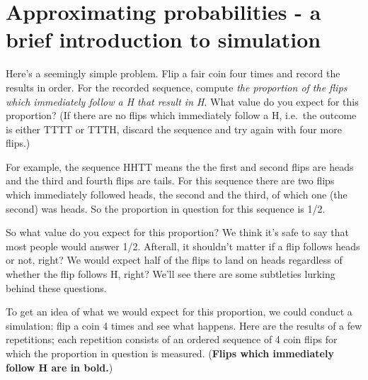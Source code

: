 \documentclass[
]{book}
\theoremstyle{definition}
\theoremstyle{definition}
\theoremstyle{definition}
\theoremstyle{remark}
\begin{document}
\hypertarget{sim}{%
\section{Approximating probabilities - a brief introduction to simulation}\label{sim}}

Here's a seemingly simple problem. Flip a fair coin four times and record the results in order. For the recorded sequence, compute \emph{the proportion of the flips which immediately follow a H that result in H}. What value do you expect for this proportion? (If there are no flips which immediately follow a H, i.e.~the outcome is either TTTT or TTTH, discard the sequence and try again with four more flips.)

For example, the sequence HHTT means the the first and second flips are heads and the third and fourth flips are tails. For this sequence there are two flips which immediately followed heads, the second and the third, of which one (the second) was heads. So the proportion in question for this sequence is 1/2.

So what value do you expect for this proportion? We think it's safe to say that most people would answer 1/2. Afterall, it shouldn't matter if a flip follows heads or not, right? We would expect half of the flips to land on heads regardless of whether the flip follows H, right? We'll see there are some subtleties lurking behind these questions.

To get an idea of what we would expect for this proportion, we could conduct a simulation: flip a coin 4 times and see what happens. Here are the results of a few repetitions; each repetition consists of an ordered sequence of 4 coin flips for which the proportion in question is measured. (\textbf{Flips which immediately follow H are in bold.})
\end{document}
